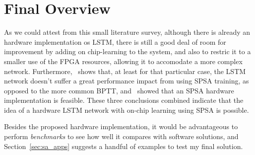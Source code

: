 \section{Final Overview}\label{sec:overview}
As we could attest from this small literature survey, although there is already an hardware implementation os LSTM, there is still a good deal of room for improvement by adding on chip-learning to the system, and also to restric it to a smaller use of the FPGA resources, allowing it to accomodate a more complex network. Furthermore,~\cite{Tavear13} shows that, at least for that particular case, the LSTM network doesn't suffer a great performance impact from using SPSA training, as opposed to the more common BPTT, and~\cite{Maeda05} showed that an SPSA hardware implementation is feasible. These three conclusions combined indicate that the idea of a hardware LSTM network with on-chip learning using SPSA is possible. 

Besides the proposed hardware implementation, it would be advantageous to perform \emph{benchmarks} to see how well it compares with software solutions, and Section~\ref{sec:sa_apps} suggests a handful of examples to test my final solution.
